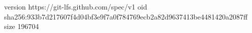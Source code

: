 version https://git-lfs.github.com/spec/v1
oid sha256:933b7d217607f4d04bf3e9f7a0f784769ecb2a82d9637413be4481420a2087ff
size 196704
